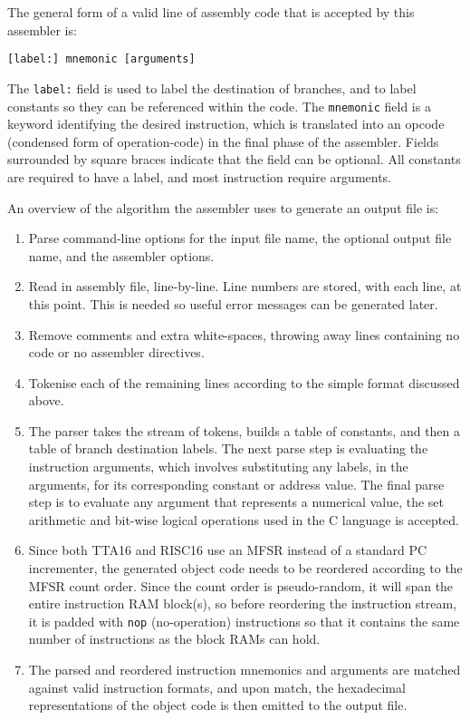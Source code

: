 \noindent The general form of a valid line of assembly code that is accepted by
this assembler is:

\begin{center}
\tt		[label:] mnemonic [arguments]
\end{center}

The \texttt{label:} field is used to label the destination of branches, and to
label constants so they can be referenced within the code. The \texttt{mnemonic}
field is a keyword identifying the desired instruction, which is translated into
an \gls{opcode} (condensed form of operation-code) in the final phase of the
assembler. Fields surrounded by square braces indicate that the field can be
optional. All constants are required to have a label, and most instruction
require arguments.

An overview of the algorithm the assembler uses to generate an output file is:

\begin{enumerate}
  \item Parse command-line options for the input file name, the optional output
  file name, and the assembler options.
  \item Read in assembly file, line-by-line. Line numbers are
  stored, with each line, at this point. This is needed so useful error
  messages can be generated later.
  \item Remove comments and extra white-spaces, throwing away lines containing
  no code or no assembler directives.
  \item Tokenise each of the remaining lines according to the simple format
  discussed above.
  \item The parser takes the stream of tokens, builds a table of constants, and
  then a table of branch destination labels. The next parse step is
  evaluating the instruction arguments, which involves substituting any
  labels, in the arguments, for its corresponding constant or address value.
  The final parse step is to evaluate any argument that represents a numerical
  value, the set arithmetic and bit-wise logical operations used in the C
  language is accepted.
  \item Since both TTA16 and RISC16 use an MFSR instead of a standard PC
  incrementer, the generated object code needs to be reordered according to
  the MFSR count order. Since the count order is pseudo-random, it will span
  the entire instruction RAM block(s), so before reordering the instruction
  stream, it is padded with \texttt{nop} (no-operation) instructions so that it
  contains the same number of instructions as the block RAMs can hold.
  \item The parsed and reordered instruction mnemonics and arguments are
  matched against valid instruction formats, and upon match, the hexadecimal
  representations of the object code is then emitted to the output file.
\end{enumerate}


